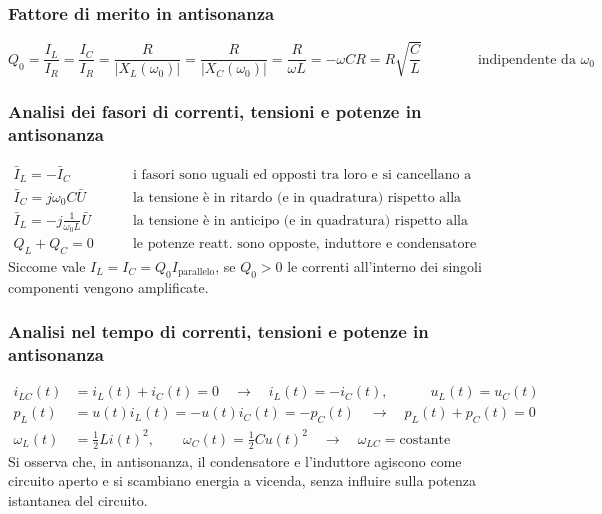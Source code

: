\documentclass[a4paper]{article}
\begin{document}
\subsubsection*{Fattore di merito in antisonanza}
\[Q_0 = \frac{I_L}{I_R} = \frac{I_C}{I_R} = \frac{R}{\left|X_L(\omega_0)\right|} = \frac{R}{\left|X_C(\omega_0)\right|} = \frac{R}{\omega L} = -\omega C R = R \sqrt{\frac{C}{L}} \qquad\qquad \text{indipendente da } \omega_0\]

\subsubsection*{Analisi dei fasori di correnti, tensioni e potenze in antisonanza}
\begin{align*}
	\bar{I}_L = - \bar{I}_C \qquad &\text{i fasori sono uguali ed opposti tra loro e si cancellano a vicenda} \\
	\bar{I}_C = j \omega_0 C \bar{U} \qquad &\text{la tensione è in ritardo (e in quadratura) rispetto alla corrente nel condensatore} \\
	\bar{I}_L = - j \frac{1}{\omega_0 L} \bar{U} \qquad &\text{la tensione è in anticipo (e in quadratura) rispetto alla corrente nell'induttanza} \\
	Q_L + Q_C = 0 \qquad &\text{le potenze reatt. sono opposte, induttore e condensatore formano un circuito aperto}
\end{align*}
Siccome vale \(I_L = I_C = Q_0 I_\text{parallelo}\), se \(Q_0 > 0\) le correnti all'interno dei singoli componenti vengono amplificate.

\subsubsection*{Analisi nel tempo di correnti, tensioni e potenze in antisonanza}
\begin{align*}
	i_{LC}(t) &= i_L(t) + i_C(t) = 0 \quad \rightarrow \quad i_L(t) = - i_C(t), \qquad\quad u_L(t) = u_C(t) \\
	p_L(t) &= u(t) i_L(t) = - u(t) i_C(t) = - p_C(t) \quad \rightarrow \quad p_L(t) + p_C(t) = 0 \\
	\omega_L(t) &= \frac{1}{2} Li(t)^2, \qquad \omega_C(t) = \frac{1}{2} Cu(t)^2 \quad \rightarrow \quad \omega_{LC} = \text{costante}
\end{align*}
Si osserva che, in antisonanza, il condensatore e l'induttore agiscono come circuito aperto e si scambiano energia a vicenda, senza
influire sulla potenza istantanea del circuito.
\end{document}
